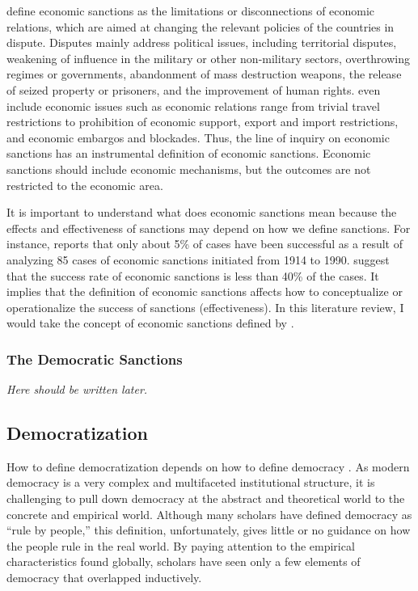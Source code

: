 \documentclass[11pt]{article}
\begin{document}
\citet{Morgan2009} define economic sanctions as the limitations or disconnections of economic relations, which are aimed at changing the relevant policies of the countries in dispute. Disputes mainly address political issues, including territorial disputes, weakening of influence in the military or other non-military sectors, overthrowing regimes or governments, abandonment of mass destruction weapons, the release of seized property or prisoners, and the improvement of human rights. \citet{Morgan2009} even include economic issues such as economic relations range from trivial travel restrictions to prohibition of economic support, export and import restrictions, and economic embargos and blockades. Thus, the line of inquiry on economic sanctions has an instrumental definition of economic sanctions. Economic sanctions should include economic mechanisms, but the outcomes are not restricted to the economic area.

It is important to understand what does economic sanctions mean because the effects and effectiveness of sanctions may depend on how we define sanctions. For instance, \citet{Pape1997} reports that only about 5\% of cases have been successful as a result of analyzing 85 cases of economic sanctions initiated from 1914 to 1990. \citet{Hufbauer2008} suggest that the success rate of economic sanctions is less than 40\% of the cases. It implies that the definition of economic sanctions affects how to conceptualize or operationalize the success of sanctions (effectiveness). In this literature review, I would take the concept of economic sanctions defined by \citet{Morgan2009}.




\subsubsection*{The Democratic Sanctions}
\textit{Here should be written later.}


\subsection*{Democratization}

How to define democratization depends on how to define democracy
\citep[797]{Treisman2020}. As modern democracy is a very complex and multifaceted institutional structure, it is challenging to pull down democracy at the abstract and theoretical world to the concrete and empirical world. Although many scholars have defined democracy as ``rule by people,'' this definition, unfortunately, gives little or no guidance on how the people rule in the real world. By paying attention to the empirical characteristics found globally, scholars have seen only a few elements of democracy that overlapped inductively.
\end{document}
